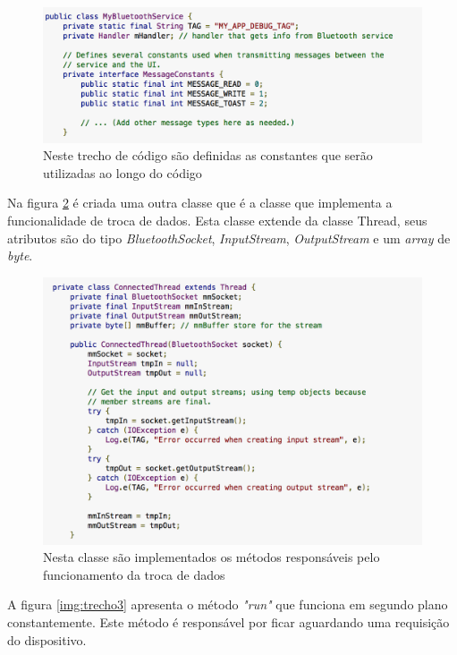   	\graphicspath{{figuras/}}
  	\begin{figure}[h!]
  	\centering
  	\includegraphics[scale=0.60]{classe_MyBluetoothService}
  	\caption{Neste trecho de código são definidas as constantes que serão utilizadas ao longo do código}
  	\label{img:trecho1}
  	\end{figure}
  
Na figura \ref{img:trecho2} é criada uma outra classe que é a classe que implementa a funcionalidade de troca de dados. Esta classe extende da classe Thread, seus atributos são do tipo \textit{BluetoothSocket}, \textit{InputStream}, \textit{OutputStream} e um \textit{array} de \textit{byte}.

\graphicspath{{figuras/}}
\begin{figure}[h!]
\centering
\includegraphics[scale=0.80]{classe_ConnectedThread}
\caption{Nesta classe são implementados os métodos responsáveis pelo funcionamento da troca de dados}
\label{img:trecho2}
\end{figure}

A figura \ref{img:trecho3} apresenta o método \textit{"run"} que funciona em segundo plano constantemente. Este método é responsável por ficar aguardando uma requisição do dispositivo.

